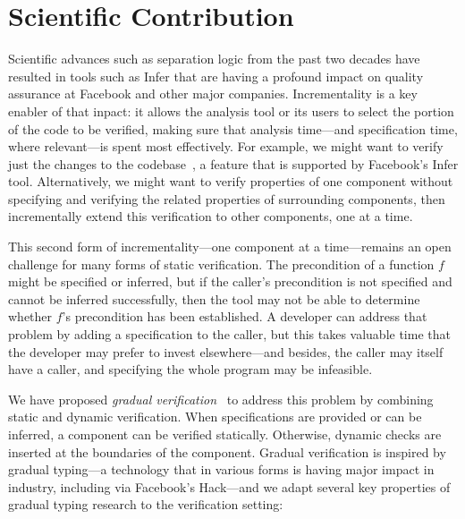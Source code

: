 \documentclass[10pt,twocolumn]{article}
\begin{document}
\begin{sloppypar}


\section{Scientific Contribution}

Scientific advances such as separation logic from the past two decades have resulted in tools such as Infer that are having a profound impact on quality assurance at Facebook and other major companies.  Incrementality is a key enabler of that inpact: it allows the analysis tool or its users to select the portion of the code to be verified, making sure that analysis time---and specification time, where relevant---is spent most effectively.  For example, we might want to verify just the changes to the codebase~\cite{StartupsScaleups}, a feature that is supported by Facebook's Infer tool.  Alternatively, we might want to verify properties of one component without specifying and verifying the related properties of surrounding components, then incrementally extend this verification to other components, one at a time.

This second form of incrementality---one component at a time---remains an open challenge for many forms of static verification.  The precondition of a function $f$ might be specified or inferred, but if the caller's precondition is not specified and cannot be inferred successfully, then the tool may not be able to determine whether $f$'s precondition has been established.  A developer can address that problem by adding a specification to the caller, but this takes valuable time that the developer may prefer to invest elsewhere---and besides, the caller may itself have a caller, and specifying the whole program may be infeasible.

We have proposed \textit{gradual verification}~\cite{GradualVerification} to address this problem by combining static and dynamic verification.  When specifications are provided or can be inferred, a component can be verified statically.  Otherwise, dynamic checks are inserted at the boundaries of the component.  Gradual verification is inspired by gradual typing---a technology that in various forms is having major impact in industry, including via Facebook's Hack---and we adapt several key properties of gradual typing research to the verification setting:


\end{sloppypar}
\end{document}
